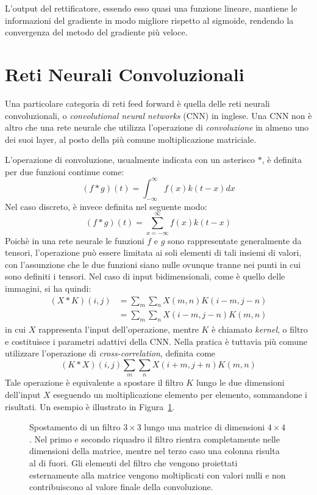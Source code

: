 L'output del rettificatore, essendo esso quasi una funzione lineare, mantiene
le informazioni del gradiente in modo migliore rispetto al sigmoide,
rendendo la convergenza del metodo del gradiente più veloce.
\section{Reti Neurali Convoluzionali}
Una particolare categoria di reti feed forward è quella delle reti neurali
convoluzionali, o \emph{convolutional neural networks} (CNN) in inglese. Una
CNN non è altro che una rete neurale che utilizza l'operazione di
\emph{convoluzione} in almeno uno dei suoi layer, al posto della più comune
moltiplicazione matriciale.

L'operazione di convoluzione, usualmente indicata con un asterisco $*$, è
definita per due funzioni continue come:
\[
(f * g)(t) = \int_{-\infty}^\infty{f(x)k(t - x)dx}
\]
Nel caso discreto, è invece definita nel seguente modo:
\[
(f * g)(t) = \sum_{x = -\infty}^\infty{f(x)k(t - x)}
\]
Poichè in una rete neurale le funzioni $f$ e $g$ sono rappresentate
generalmente da tensori, l'operazione può essere limitata ai soli elementi di
tali insiemi di valori, con l'assunzione che le due funzioni siano nulle
ovunque tranne nei punti in cui sono definiti i tensori. Nel caso di input
bidimensionali, come è quello delle immagini, si ha quindi:
\begin{align*}
(X * K)(i,j) &= \sum_m{\sum_n{X(m,n) K(i - m, j - n)}} \\
             &= \sum_m{\sum_n{X(i - m, j - n) K(m, n)}}
\end{align*}
in cui $X$ rappresenta l'input dell'operazione, mentre $K$ è chiamato
\emph{kernel}, o filtro e costituisce i parametri adattivi della CNN\@. Nella
pratica è tuttavia più comune utilizzare l'operazione di
\emph{cross-correlation}, definita come
\[ (K * X)(i, j) \sum_m{\sum_n{X(i + m, j + n) K(m, n)}} \]
Tale operazione è equivalente a spostare il filtro $K$ lungo le due dimensioni
dell'input $X$ eseguendo un moltiplicazione elemento per elemento, sommandone i
risultati. Un esempio è illustrato in Figura~\ref{fig:conv}.
\begin{figure}[!htp]
  \caption{%
    Spostamento di un filtro $3\times3$ lungo una matrice di dimensioni
    $4\times4$. Nel primo e secondo riquadro il filtro rientra completamente
    nelle dimensioni della matrice, mentre nel terzo caso una colonna risulta
    al di fuori. Gli elementi del filtro che vengono proiettati esternamente
    alla matrice vengono moltiplicati con valori nulli e non contribuiscono al
    valore finale della convoluzione.
  }%
  \label{fig:conv}
\end{figure}
